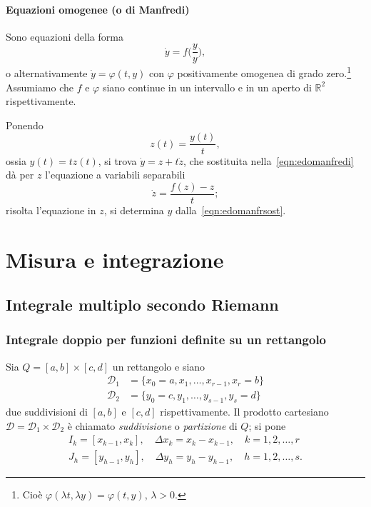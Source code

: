 \documentclass[a4paper]{book}
\numberwithin{equation}{section}
\renewcommand{\phi}{\varphi}
\theoremstyle{plain}
\theoremstyle{definition}
\theoremstyle{remark}
\theoremstyle{example}
\begin{document}
	\subsubsection*{Equazioni omogenee (o di Manfredi)}
	Sono equazioni della forma
		\begin{equation}
			\label{eqn:edomanfredi}
			\dot{y} = f\Biggr(\frac{y}{y}\Biggr),
		\end{equation}
	o alternativamente $\dot{y} = \phi(t, y)$ con $\phi$ positivamente omogenea di grado zero.\footnote{Cioè $\phi(\lambda t, \lambda y) = \phi(t, y)$, $\lambda > 0$.}
	Assumiamo che $f$ e $\phi$ siano continue in un intervallo e in un aperto di $\mathbb{R}^2$ rispettivamente.

	Ponendo
		\begin{equation}
			\label{eqn:edomanfrsost}
			z(t) = \frac{y(t)}{t},
		\end{equation}
	ossia $y(t) = tz(t)$, si trova $\dot{y} = z + t\dot{z}$, che sostituita nella~\eqref{eqn:edomanfredi} dà per $z$ l'equazione a variabili separabili
		\begin{equation*}
			\dot{z} = \frac{f(z) - z}{t};
		\end{equation*}
	risolta l'equazione in $z$, si determina $y$ dalla~\eqref{eqn:edomanfrsost}.







		\chapter{Misura e integrazione}
		\section{Integrale multiplo secondo Riemann}
		\subsection{Integrale doppio per funzioni definite su un rettangolo}
		Sia $Q = [a, b] \times [c, d]$ un rettangolo e siano
		\begin{align*}
			\mathcal{D}_1 &= \{ x_0 = a, x_1, \dots, x_{r-1}, x_r = b\} \\
			\mathcal{D}_2 &= \{ y_0 = c, y_1, \dots, y_{s-1}, y_s = d \}
		\end{align*}
		due suddivisioni di $[a, b]$ e $[c, d]$ rispettivamente. Il prodotto cartesiano $\mathcal{D} = \mathcal{D}_1 \times \mathcal{D}_2$ è chiamato \emph{suddivisione} o \emph{partizione} di $Q$; si pone
		\begin{align*}
			I_k = [x_{k-1}, x_k], \quad \Delta x_k = x_k - x_{k-1}, \quad k = 1, 2, \dots, r \\
			J_h = [y_{h-1}, y_h], \quad \Delta y_h = y_h - y_{h-1}, \quad h = 1, 2, \dots, s.
		\end{align*}
\end{document}
